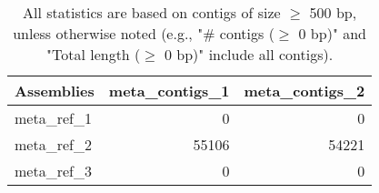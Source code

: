 \documentclass[12pt,a4paper]{article}
\begin{document}
\begin{table}[ht]
\begin{center}
\caption{All statistics are based on contigs of size $\geq$ 500 bp, unless otherwise noted (e.g., "\# contigs ($\geq$ 0 bp)" and "Total length ($\geq$ 0 bp)" include all contigs).}
\begin{tabular}{|l*{2}{|r}|}
\hline
Assemblies & meta\_contigs\_1 & meta\_contigs\_2 \\ \hline
meta\_ref\_1 & 0 & 0 \\ \hline
meta\_ref\_2 & 55106 & 54221 \\ \hline
meta\_ref\_3 & 0 & 0 \\ \hline
\end{tabular}
\end{center}
\end{table}
\end{document}

